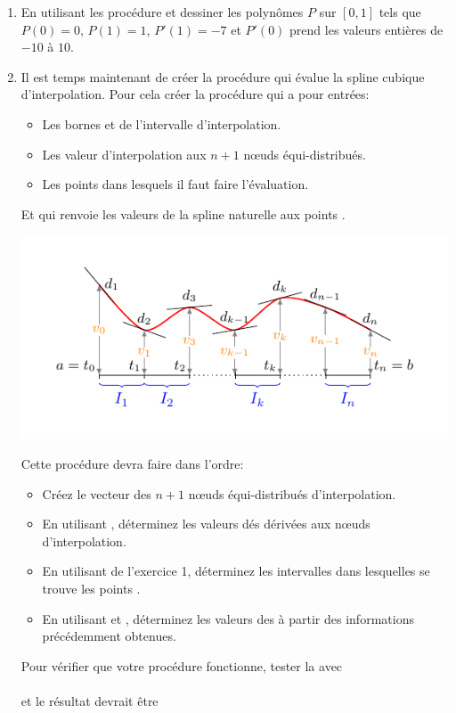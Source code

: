 \documentclass[a4paper,12pt,reqno]{amsart}
\begin{document}
\begin{exo}
\begin{enumerate}
    \item En utilisant les procédure  et  dessiner les polynômes $P$ sur $[0,1]$ tels que $P(0)=0$, $P(1)=1$, $P'(1)=-7$ et $P'(0)$ prend les valeurs entières de $-10$ à $10$.

    \item Il est temps maintenant de créer la procédure qui évalue la spline cubique d'interpolation. Pour cela créer la procédure  qui a pour entrées:
    \begin{itemize}
      \item Les bornes  et  de l'intervalle d'interpolation.

      \item Les valeur  d'interpolation aux  $n+1$ nœuds équi-distribués.

      \item Les points  dans lesquels il faut faire l'évaluation.
    \end{itemize}
    Et qui renvoie les valeurs  de la spline naturelle aux points .

    \begin{center}
      \includegraphics[width=15cm]{CubbicSpline}
    \end{center}

    Cette procédure devra faire dans l'ordre:
    \begin{itemize}
       \item Créez le vecteur  des $n+1$ nœuds équi-distribués d'interpolation.
       \item En utilisant , déterminez les valeurs dés dérivées aux nœuds d'interpolation.
       \item En utilisant  de l'exercice 1, déterminez les intervalles dans lesquelles se trouve les points .
       \item En utilisant  et , déterminez les valeurs des  à partir des informations précédemment obtenues.
     \end{itemize}
     Pour vérifier que votre procédure fonctionne, tester la avec\\
     \indent {}\\
     et le résultat devrait être\\
     \indent {}


\end{enumerate}
\end{exo}
\end{document}
